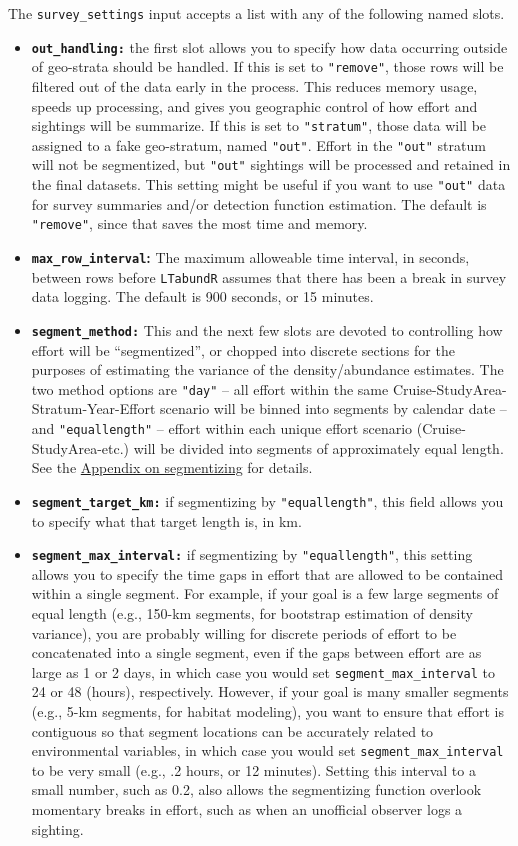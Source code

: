 \documentclass[
]{book}
\begin{document}
The \texttt{survey\_settings} input accepts a list with any of the following named slots.

\begin{itemize}
\item
  \textbf{\texttt{out\_handling:}} the first slot allows you to specify how data occurring outside of geo-strata should be handled. If this is set to \texttt{"remove"}, those rows will be filtered out of the data early in the process. This reduces memory usage, speeds up processing, and gives you geographic control of how effort and sightings will be summarize. If this is set to \texttt{"stratum"}, those data will be assigned to a fake geo-stratum, named \texttt{"out"}. Effort in the \texttt{"out"} stratum will not be segmentized, but \texttt{"out"} sightings will be processed and retained in the final datasets. This setting might be useful if you want to use \texttt{"out"} data for survey summaries and/or detection function estimation. The default is \texttt{"remove"}, since that saves the most time and memory.
\item
  \textbf{\texttt{max\_row\_interval}:} The maximum alloweable time interval, in seconds, between rows before \texttt{LTabundR} assumes that there has been a break in survey data logging. The default is 900 seconds, or 15 minutes.
\item
  \textbf{\texttt{segment\_method:}} This and the next few slots are devoted to controlling how effort will be ``segmentized'', or chopped into discrete sections for the purposes of estimating the variance of the density/abundance estimates. The two method options are \texttt{"day"} -- all effort within the same Cruise-StudyArea-Stratum-Year-Effort scenario will be binned into segments by calendar date -- and \texttt{"equallength"} -- effort within each unique effort scenario (Cruise-StudyArea-etc.) will be divided into segments of approximately equal length. See the \protect\hyperlink{segmentizing}{Appendix on segmentizing} for details.
\item
  \textbf{\texttt{segment\_target\_km:}} if segmentizing by \texttt{"equallength"}, this field allows you to specify what that target length is, in km.
\item
  \textbf{\texttt{segment\_max\_interval:}} if segmentizing by \texttt{"equallength"}, this setting allows you to specify the time gaps in effort that are allowed to be contained within a single segment. For example, if your goal is a few large segments of equal length (e.g., 150-km segments, for bootstrap estimation of density variance), you are probably willing for discrete periods of effort to be concatenated into a single segment, even if the gaps between effort are as large as 1 or 2 days, in which case you would set \texttt{segment\_max\_interval} to 24 or 48 (hours), respectively. However, if your goal is many smaller segments (e.g., 5-km segments, for habitat modeling), you want to ensure that effort is contiguous so that segment locations can be accurately related to environmental variables, in which case you would set \texttt{segment\_max\_interval} to be very small (e.g., .2 hours, or 12 minutes). Setting this interval to a small number, such as 0.2, also allows the segmentizing function overlook momentary breaks in effort, such as when an unofficial observer logs a sighting.

\end{itemize}
\end{document}
